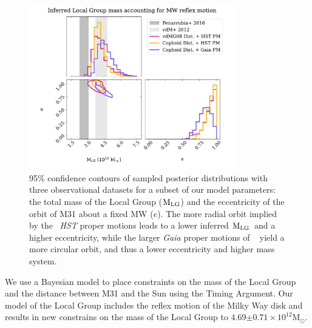 \documentclass[twocolumn]{aastex631}
\newcommand{\mlg}{\ensuremath{\textrm{M}_{\rm LG}}}
\newcommand{\msun}{\ensuremath{\textrm{M}_{\odot}}}
\begin{document}
\begin{figure}[htb]
  \centering
  \includegraphics[width=0.8\textwidth,trim=1.3cm 0.8cm 1.3cm 0cm,clip=true]
  {analyze-runs-contour.pdf}
  \caption{\label{fig:contour} 95\% confidence contours of sampled posterior
  distributions with three observational datasets for a subset of our model
  parameters: the total mass of the Local Group (\mlg)
  and the eccentricity of the orbit of M31 about a fixed MW ($e$).
  The more radial orbit implied by the~\cite{vdm2012} \textit{HST} proper
  motions leads to a lower inferred \mlg\ and a higher
  eccentricity, while the larger \textit{Gaia} proper motions of
  ~\cite{Salomon2021} yield a more circular orbit, and thus a lower eccentricity
   and higher mass system.
  }
\end{figure}


We use a Bayesian model to place constraints on the mass of the Local Group and the distance between M31 and the Sun using the Timing Argument. Our model of the Local Group includes the reflex motion of the Milky Way disk and results in new constrains on the mass of the Local Group to 4.69$\pm0.71 \times 10^{12}\msun$.
\end{document}
